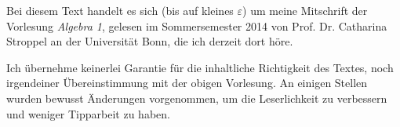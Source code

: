 Bei diesem Text handelt es sich (bis auf kleines $\varepsilon$) um meine Mitschrift der Vorlesung \emph{Algebra 1}, gelesen im Sommersemester 2014 von Prof. Dr. Catharina Stroppel an der Universität Bonn, die ich derzeit dort höre.

Ich übernehme keinerlei Garantie für die inhaltliche Richtigkeit des Textes, noch irgendeiner Übereinstimmung mit der obigen Vorlesung. An einigen Stellen wurden bewusst Änderungen vorgenommen, um die Leserlichkeit zu verbessern und weniger Tipparbeit zu haben.